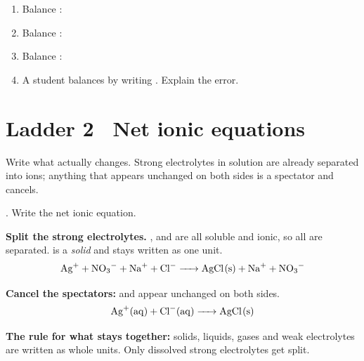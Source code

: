 \documentclass{apchem-worksheet}
\begin{document}
\begin{yourturn}
\begin{enumerate}[leftmargin=*,itemsep=0.5em]
  \item Balance : \workspace[1.4cm]
  \item Balance : \workspace[1.6cm]
  \item Balance : \workspace[1.6cm]
  \item A student balances  by writing .
        Explain the error. \workspace[1.8cm]
\end{enumerate}
\end{yourturn}

\section*{\sffamily Ladder 2 \textbullet\ Net ionic equations}

Write what actually changes. Strong electrolytes in solution are already
separated into ions; anything that appears unchanged on both sides is a
spectator and cancels.

\begin{workedexample}
. Write the net ionic
equation.

\textbf{Split the strong electrolytes.} ,  and
 are all soluble and ionic, so all are separated.  is
a \emph{solid} and stays written as one unit.
\[ \ce{Ag+ + NO3^- + Na+ + Cl^- -> AgCl(s) + Na+ + NO3^-} \]

\textbf{Cancel the spectators:}  and  appear unchanged on
both sides.
\[ \ce{Ag+(aq) + Cl^-(aq) -> AgCl(s)} \]

\textbf{The rule for what stays together:} solids, liquids, gases and weak
electrolytes are written as whole units. Only dissolved strong
electrolytes get split.
\end{workedexample}
\end{document}
